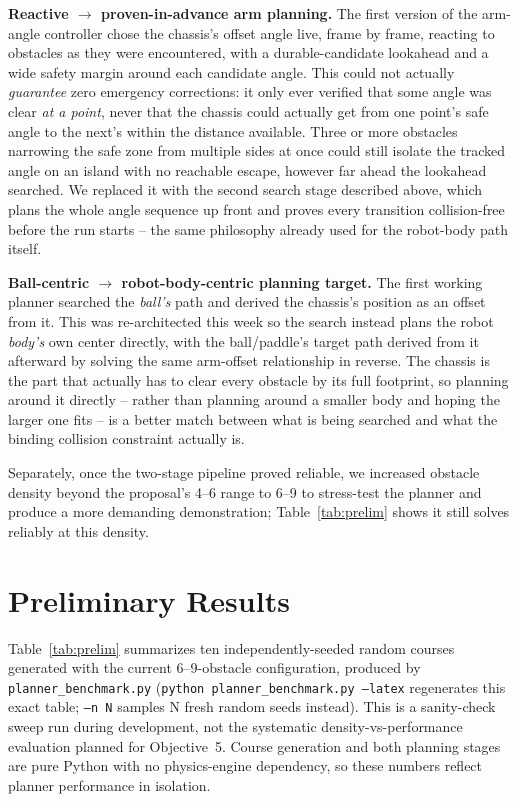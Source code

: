 \documentclass[10pt,twocolumn]{article}
\begin{document}
\textbf{Reactive $\rightarrow$ proven-in-advance arm planning.} The first
version of the arm-angle controller chose the chassis's offset angle
live, frame by frame, reacting to obstacles as they were encountered, with
a durable-candidate lookahead and a wide safety margin around each
candidate angle. This could not actually \emph{guarantee} zero emergency
corrections: it only ever verified that some angle was clear \emph{at a
point}, never that the chassis could actually get from one point's safe
angle to the next's within the distance available. Three or more obstacles
narrowing the safe zone from multiple sides at once could still isolate
the tracked angle on an island with no reachable escape, however far ahead
the lookahead searched. We replaced it with the second search stage
described above, which plans the whole angle sequence up front and proves
every transition collision-free before the run starts -- the same
philosophy already used for the robot-body path itself.

\textbf{Ball-centric $\rightarrow$ robot-body-centric planning target.}
The first working planner searched the \emph{ball's} path and derived the
chassis's position as an offset from it. This was re-architected this week
so the search instead plans the robot \emph{body's} own center directly,
with the ball/paddle's target path derived from it afterward by solving
the same arm-offset relationship in reverse. The chassis is the part that
actually has to clear every obstacle by its full footprint, so planning
around it directly -- rather than planning around a smaller body and hoping
the larger one fits -- is a better match between what is being searched
and what the binding collision constraint actually is.

Separately, once the two-stage pipeline proved reliable, we increased
obstacle density beyond the proposal's 4--6 range to 6--9 to stress-test
the planner and produce a more demanding demonstration; Table~\ref{tab:prelim}
shows it still solves reliably at this density.

\section{Preliminary Results}
Table~\ref{tab:prelim} summarizes ten independently-seeded random courses
generated with the current 6--9-obstacle configuration, produced by
\texttt{planner\_benchmark.py} (\texttt{python planner\_benchmark.py
--latex} regenerates this exact table; \texttt{--n N} samples N fresh
random seeds instead). This is a sanity-check sweep run during
development, not the systematic density-vs-performance evaluation planned
for Objective~5. Course generation and both planning stages are pure
Python with no physics-engine dependency, so these numbers reflect planner
performance in isolation.
\end{document}
